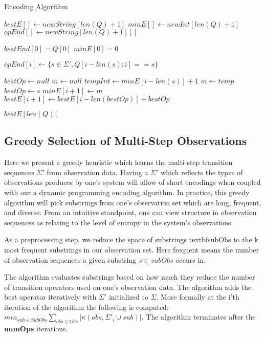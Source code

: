 \begin{algorithm}
\caption{Encoding Algorithm}
\label{Encoding Algorithm}
\begin{algorithmic}[1]

\State $bestE[] \gets new String[len(Q)+1]$
\State $minE[] \gets new Int[len(Q)+1]$
\State $opEnd[] \gets new String[len(Q)+1][]$

\State $bestEnd[0] = Q[0]$
\State $minE[0] = 0$

	 \State $opEnd[i] \gets \{s \in \Sigma', Q[i-len(s):i] == s\}$
\EndFor

	\State $bestOp \gets null$
	\State $m \gets null$ 
		\State $tempInt \gets minE[i-len(s)] + 1$
			\State $m \gets temp$ 
			\State $bestOp \gets s$
		\EndIf
	\EndFor
	\State $minE[i+1] \gets m$
	\State $bestE[i+1] \gets bestE[i-len(bestOp)] + bestOp$
\EndFor

\Return $bestE[len(Q)]$

\EndProcedure
\end{algorithmic}
\end{algorithm}

\subsection{Greedy Selection of Multi-Step Observations}

Here we present a greedy heuristic which learns the multi-step transition sequences $\Sigma'$ from observation data. Having a $\Sigma'$ which reflects the types of observations produces by one's system will allow of short encodings when coupled with our a dynamic programming encoding algorithm. In practice, this greedy algorithm will pick substrings from one's observation set which are long, frequent, and diverse. From an intuitive standpoint, one can view structure in observation sequences as relating to the level of entropy in the system's observations. 

As a preprocessing step, we reduce the space of substrings textbf{subObs} to the k most frequent substrings in our observation set. Here frequent means the number of observation sequences a given substring $s \in subObs$ occurs in. 

The algorithm evaluates substrings based on how much they reduce the number of transition operators used on one's observation data. The algorithm adds the best operator iteratively with $\Sigma'$ initialized to $\Sigma$. More formally at the i'th iteration of the algorithm the following is computed: $min_{sub \in SubObs} \sum\nolimits_{obs \in Obs}|\kappa(obs,\Sigma'_i \cup sub)|$. The algorithm terminates after the \textbf{numOps} iterations. 

